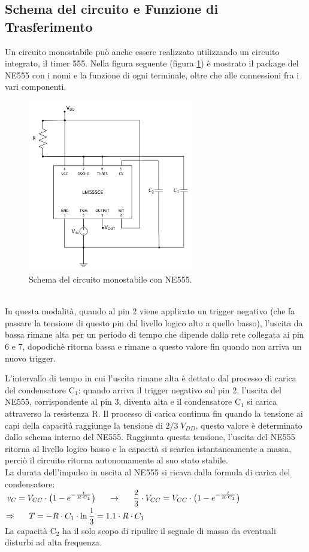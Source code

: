 \documentclass{report}
\begin{document}
\subsection{Schema del circuito e Funzione di Trasferimento}
Un circuito monostabile può anche essere realizzato utilizzando un circuito integrato, il timer 555. Nella figura seguente (figura \ref{figura:schema2}) è mostrato il package del NE555 con i nomi e la funzione di ogni terminale, oltre che alle connessioni fra i vari componenti.
\begin{figure}[h!]
	\centering
	\includegraphics[height=7.5cm]{immagini/schema2}
	\caption{Schema del circuito monostabile con NE555.}
	\label{figura:schema2}
\end{figure}
\\In questa modalità, quando al pin 2 viene applicato un trigger negativo (che fa passare la tensione di questo pin dal livello logico alto a quello basso), l'uscita da bassa rimane alta per un periodo di tempo che dipende dalla rete collegata ai pin 6 e 7, dopodichè ritorna bassa e rimane a questo valore fin quando non arriva un nuovo trigger.\par
L'intervallo di tempo in cui l'uscita rimane alta è dettato dal processo di carica del condensatore $\mathrm{C_1}$: quando arriva il trigger negativo sul pin 2, l'uscita del NE555, corrispondente al pin 3, diventa alta e il condensatore $\mathrm{C_1}$ si carica attraverso la resistenza $\mathrm{R}$. Il processo di carica continua fin quando la tensione ai capi della capacità raggiunge la tensione di $\displaystyle{2/3\;V_{DD}}$, questo valore è determinato dallo schema interno del NE555. Raggiunta questa tensione, l'uscita del NE555 ritorna al livello logico basso e la capacità si scarica istantaneamente a massa, perciò il circuito ritorna autonomamente al suo stato stabile.
\\La durata dell'impulso in uscita al NE555 si ricava dalla formula di carica del condensatore: 
\\[4pt]\indent$\displaystyle{v_C=V_{CC}\cdot\bigl(1-e^{-\frac{t}{R\cdot C_1}}\bigr)\indent\rightarrow\indent\frac{2}{3}\cdot V_{CC}=V_{CC}\cdot\bigl(1-e^{-\frac{t}{R\cdot C_1}}\bigr)}$
\\[4pt]\indent$\displaystyle{\Rightarrow\indent T=-R\cdot C_1\cdot\ln\frac{1}{3}=1.1\cdot R\cdot C_1}$
\\La capacità $\mathrm{C_2}$ ha il solo scopo di ripulire il segnale di massa da eventuali disturbi ad alta frequenza.
\end{document}
